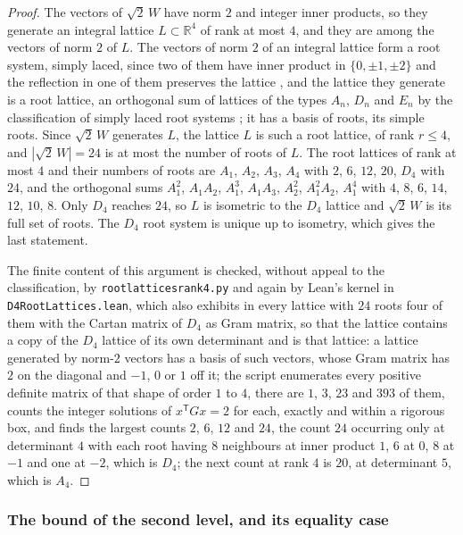 \documentclass[11pt,reqno]{amsart}
\renewcommand{\_}{\origunderscore\allowbreak}
\numberwithin{equation}{section}
\theoremstyle{plain}
\theoremstyle{definition}
\theoremstyle{remark}
\begin{document}
\begin{proof}
The vectors of $\sqrt2\,W$ have norm $2$ and integer inner products, so
they generate an integral lattice $L\subset\mathbb{R}^4$ of rank at most
$4$, and they are among the vectors of norm $2$ of $L$. The vectors of
norm $2$ of an integral lattice form a root system, simply laced, since
two of them have inner product in $\{0,\pm1,\pm2\}$ and the reflection
in one of them preserves the lattice
\cite[Ch.~4]{CS1988}, and the lattice they generate is a root
lattice, an orthogonal sum of lattices of the types $A_n$, $D_n$ and
$E_n$ by the classification of simply laced root systems
\cite[Ch.~2]{Hum90}; it has a basis of roots, its simple roots. Since
$\sqrt2\,W$ generates $L$, the lattice $L$ is such a root lattice, of
rank $r\le4$, and $|\sqrt2\,W|=24$ is at most the number of roots of
$L$. The root lattices of rank at most $4$ and their numbers of roots
are $A_1$, $A_2$, $A_3$, $A_4$ with $2$, $6$, $12$, $20$, $D_4$ with
$24$, and the orthogonal sums $A_1^2$, $A_1A_2$, $A_1^3$, $A_1A_3$,
$A_2^2$, $A_1^2A_2$, $A_1^4$ with $4$, $8$, $6$, $14$, $12$, $10$, $8$.
Only $D_4$ reaches $24$, so $L$ is isometric to the $D_4$ lattice and
$\sqrt2\,W$ is its full set of roots. The $D_4$ root system is unique up
to isometry, which gives the last statement.

The finite content of this argument is checked, without appeal to the
classification, by \texttt{root\_lattices\_rank4.py} and again by Lean's
kernel in \texttt{D4RootLattices.lean}, which also exhibits in every
lattice with $24$ roots four of them with the Cartan matrix of $D_4$ as
Gram matrix, so that the lattice contains a copy of the $D_4$ lattice of
its own determinant and is that lattice:
a lattice generated by norm-$2$ vectors has a basis of such vectors,
whose Gram matrix has $2$ on the diagonal and $-1$, $0$ or $1$ off it;
the script enumerates every positive definite matrix of that shape of
order $1$ to $4$, there are $1$, $3$, $23$ and $393$ of them, counts the
integer solutions of $x^{\mathsf T}Gx=2$ for each, exactly and within a
rigorous box, and finds the largest counts $2$, $6$, $12$ and $24$, the
count $24$ occurring only at determinant $4$ with each root having $8$
neighbours at inner product $1$, $6$ at $0$, $8$ at $-1$ and one at
$-2$, which is $D_4$; the next count at rank $4$ is $20$, at determinant
$5$, which is $A_4$.
\end{proof}

\subsubsection{The bound of the second level, and its equality case}
\label{sec:las2}
\end{document}
